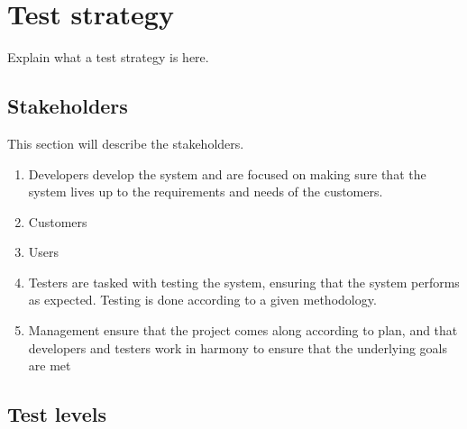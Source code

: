 \section{Test strategy}

Explain what a test strategy is here. 

\subsection{Stakeholders}

This section will describe the stakeholders.

\begin{enumerate}
    \item Developers develop the system and are focused on making sure that the system lives up to the requirements and needs of the customers. 
    \item Customers 
    \item Users
    \item Testers are tasked with testing the system, ensuring that the system performs as expected. Testing is done according to a given methodology. 
    \item Management ensure that the project comes along according to plan, and that developers and testers work in harmony to ensure that the underlying goals are met
\end{enumerate}






\subsection{Test levels}
